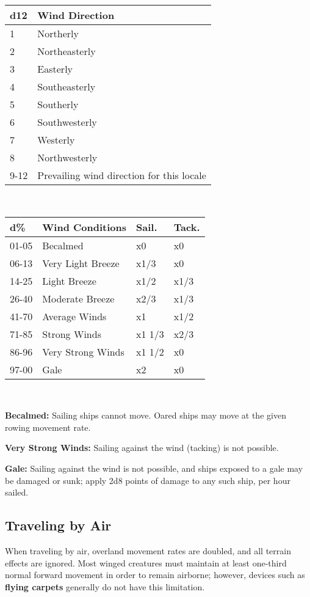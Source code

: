 \documentclass[a4paper,twoside,openany,10pt]{book}
\begin{document}
\begin{multicols}{2}
\begin{tabular*}{0.93\linewidth}{@{\extracolsep{\fill}}ll}
\textbf{d12} & \textbf{Wind Direction} \\\toprule
1 & Northerly \\\hline
2 & Northeasterly \\\hline
3 & Easterly \\\hline
4 & Southeasterly \\\hline
5 & Southerly \\\hline
6 & Southwesterly \\\hline
7 & Westerly \\\hline
8 & Northwesterly \\\hline
9-12 & Prevailing wind direction for this locale \\\bottomrule
\end{tabular*}\\\medskip

\begin{tabularx}{0.45\textwidth}{@{}lXll@{}}
\textbf{d\%} & \textbf{Wind Conditions} & \textbf{Sail.} & \textbf{Tack.} \\\toprule
01-05 & Becalmed & x0 & x0 \\\hline
06-13 & Very Light Breeze & x1/3 & x0 \\\hline
14-25 & Light Breeze & x1/2 & x1/3 \\\hline
26-40 & Moderate Breeze & x2/3 & x1/3 \\\hline
41-70 & Average Winds & x1 & x1/2 \\\hline
71-85 & Strong Winds & x1 1/3 & x2/3 \\\hline
86-96 & Very Strong Winds & x1 1/2 & x0 \\\hline
97-00 & Gale & x2 & x0 \\\bottomrule
\end{tabularx}\\\medskip

\textbf{Becalmed: }Sailing ships cannot move. Oared ships may move at
the given rowing movement rate.

\textbf{Very Strong Winds:} Sailing against the wind (tacking) is not
possible.

\textbf{Gale:} Sailing against the wind is not possible, and ships
exposed to a gale may be damaged or sunk; apply 2d8 points of damage to
any such ship, per hour sailed.

\subsection{Traveling by Air}\label{traveling-by-air}

When traveling by air, overland movement rates are doubled, and all terrain effects are ignored. Most winged creatures must maintain at least one-third normal forward movement in order to remain airborne; however, devices such as \textbf{flying carpets} generally do not have this limitation.

\end{multicols}
\end{document}
